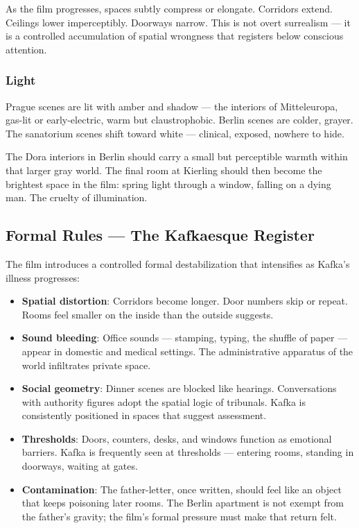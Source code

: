 As the film progresses, spaces subtly compress or elongate. Corridors extend. Ceilings lower imperceptibly. Doorways narrow. This is not overt surrealism --- it is a controlled accumulation of spatial wrongness that registers below conscious attention.

\subsubsection{Light}
Prague scenes are lit with amber and shadow --- the interiors of Mitteleuropa, gas-lit or early-electric, warm but claustrophobic. Berlin scenes are colder, grayer. The sanatorium scenes shift toward white --- clinical, exposed, nowhere to hide.

The Dora interiors in Berlin should carry a small but perceptible warmth within that larger gray world. The final room at Kierling should then become the brightest space in the film: spring light through a window, falling on a dying man. The cruelty of illumination.

\subsection{Formal Rules --- The Kafkaesque Register}

The film introduces a controlled formal destabilization that intensifies as Kafka's illness progresses:

\begin{itemize}[leftmargin=*]
\item \textbf{Spatial distortion}: Corridors become longer. Door numbers skip or repeat. Rooms feel smaller on the inside than the outside suggests.
\item \textbf{Sound bleeding}: Office sounds --- stamping, typing, the shuffle of paper --- appear in domestic and medical settings. The administrative apparatus of the world infiltrates private space.
\item \textbf{Social geometry}: Dinner scenes are blocked like hearings. Conversations with authority figures adopt the spatial logic of tribunals. Kafka is consistently positioned in spaces that suggest assessment.
\item \textbf{Thresholds}: Doors, counters, desks, and windows function as emotional barriers. Kafka is frequently seen at thresholds --- entering rooms, standing in doorways, waiting at gates.
\item \textbf{Contamination}: The father-letter, once written, should feel like an object that keeps poisoning later rooms. The Berlin apartment is not exempt from the father's gravity; the film's formal pressure must make that return felt.
\end{itemize}

